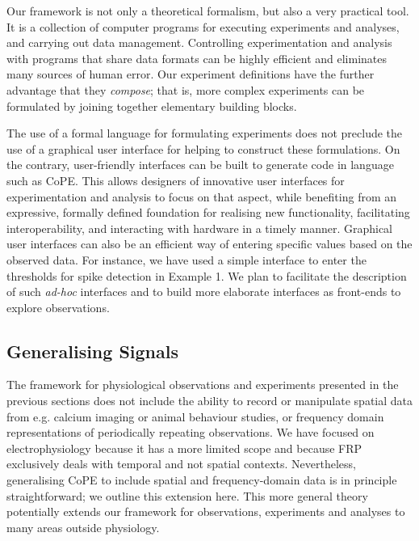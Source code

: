\documentclass[11pt]{article}
\begin{document}
Our framework is not only a theoretical formalism, but also a very
practical tool. It is a collection of computer programs for executing
experiments and analyses, and carrying out data
management. Controlling experimentation and analysis with programs
that share data formats can be highly efficient and eliminates
many sources of human error. Our experiment definitions have the
further advantage that they \emph{compose}; that is, more complex
experiments can be formulated by joining together elementary building
blocks. 

The use of a formal language for formulating experiments does not preclude the
use of a graphical user interface for helping to construct these formulations.
On the contrary, user-friendly interfaces can be built to generate
code in language such as CoPE. This allows designers of innovative user
interfaces for experimentation and analysis to focus on that aspect, while
benefiting from an expressive, formally defined foundation for
realising new functionality, facilitating interoperability, 
and interacting with hardware in a timely manner.
Graphical user interfaces can also be an efficient way of
entering specific values based on the observed data. For instance, we have
used a simple interface to enter the thresholds for spike detection in Example
1. We plan to facilitate the description of such \emph{ad-hoc} interfaces and
to build more elaborate interfaces as front-ends to explore observations.

\subsection*{Generalising Signals}
\label{sec-gensig}


The framework for physiological observations and experiments presented
in the previous sections does not include the ability to record or
manipulate spatial data from e.g. calcium imaging or animal behaviour studies,
or frequency domain representations of periodically repeating
observations. We have focused on electrophysiology because it has a
more limited scope and because FRP exclusively deals with temporal and
not spatial contexts. Nevertheless, generalising CoPE to include
spatial and frequency-domain data is in principle straightforward;
we outline this extension here. This more general theory potentially extends
our framework for observations, experiments and analyses to many areas outside
physiology.
\end{document}
